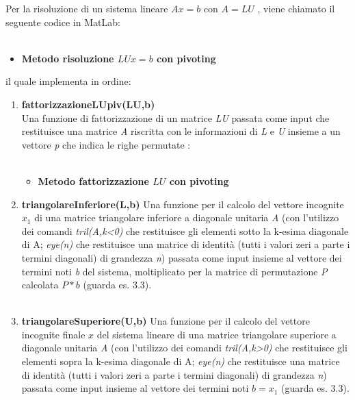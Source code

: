 Per la risoluzione di un sistema lineare $Ax=b$ con $A=LU$ , viene chiamato il seguente codice in MatLab:\\\
\begin{itemize}
	\item \textbf{Metodo risoluzione $LUx=b$ con pivoting}
		
\end{itemize}
il quale implementa in ordine:
\begin{enumerate}
	\item \textbf{fattorizzazioneLUpiv(LU,b)}\\
		Una funzione di fattorizzazione di un matrice \textit{LU} passata come input che restituisce una matrice \textit{A} riscritta con le informazioni di \textit{L} e \textit{U} insieme a un vettore \textit{p} che indica le righe permutate :\\\
\begin{itemize}
	\item \textbf{Metodo fattorizzazione $LU$ con pivoting}
		
\end{itemize}
	\item \textbf{triangolareInferiore(L,b)}
		Una funzione per il calcolo del vettore incognite $x_1$ di una matrice triangolare inferiore a diagonale unitaria \textit{A} (con l'utilizzo dei comandi \textit{tril(A,k<0)} che restituisce gli elementi sotto la k-esima diagonale di A; \textit{eye(n)} che restituisce una matrice di identità (tutti i valori zeri a parte i termini diagonali) di grandezza \textit{n}) passata come input insieme al vettore dei termini noti \textit{b} del sistema, moltiplicato per la matrice di permutazione \textit{P} calcolata $P*b$ (guarda es. 3.3). \\\
	\item \textbf{triangolareSuperiore(U,b)}
		Una funzione per il calcolo del vettore incognite finale $x$ del sistema lineare di una matrice triangolare superiore a diagonale unitaria \textit{A} (con l'utilizzo dei comandi \textit{tril(A,k>0)} che restituisce gli elementi sopra la k-esima diagonale di A; \textit{eye(n)} che restituisce una matrice di identità (tutti i valori zeri a parte i termini diagonali) di grandezza \textit{n}) passata come input insieme al vettore dei termini noti $b=x_1$ (guarda es. 3.3).\\\
\end{enumerate}